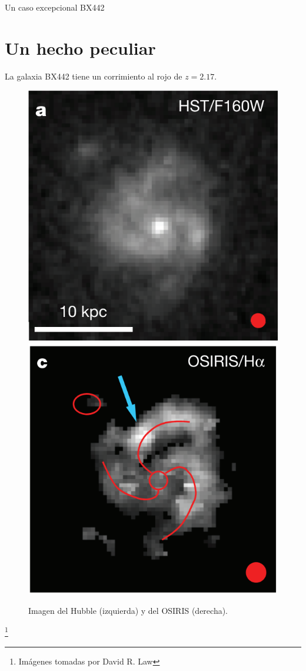 \documentclass{beamer}
\newcommand\blfootnote[1]{%
  \begingroup
  \renewcommand\thefootnote{}\footnote{#1}%
  \addtocounter{footnote}{-1}%
  \endgroup
}
\begin{document}
\begin{frame}{Un caso excepcional BX442}
\section{Un hecho peculiar}
\begin{exampleblock}{}
La galaxia BX442 tiene un corrimiento al rojo de $z = 2.17$.
\end{exampleblock}
\begin{figure}[h!]
\includegraphics[scale=0.35]{galax1}\hspace{1cm}
\includegraphics[scale=0.35]{galax2}
\caption{Imagen del Hubble (izquierda) y del OSIRIS (derecha).}
\end{figure}
\blfootnote{Imágenes tomadas por David R. Law}
\end{frame}
\end{document}
